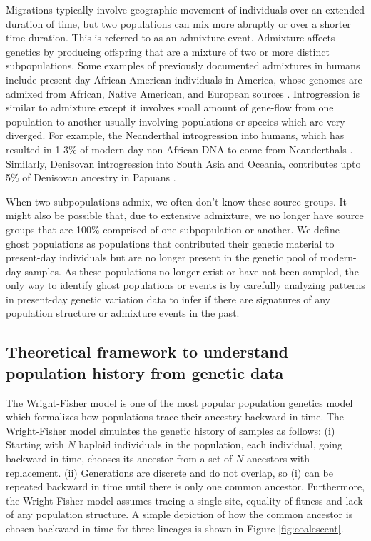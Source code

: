 Migrations typically involve geographic movement of individuals over an extended duration of time, but two populations can mix more abruptly or over a shorter time duration. This is referred to as an admixture event. Admixture affects genetics by producing offspring that are a mixture of two or more distinct subpopulations. Some examples of previously documented admixtures in humans include present-day African American individuals in America, whose genomes are admixed from African, Native American, and European sources \cite{smith2004high, price2009sensitive}. Introgression is similar to admixture except it involves small amount of gene-flow from one population to another usually involving populations or species which are very diverged. For example, the Neanderthal introgression into humans, which has resulted in 1-3\% of modern day non African DNA to come from Neanderthals \cite{sankararaman2014genomic}. Similarly, Denisovan introgression into South Asia and Oceania, contributes upto 5\% of Denisovan ancestry in Papuans \cite{reich2010genetic}. 

When two subpopulations admix, we often don't know these source groups. It might also be possible that, due to extensive admixture, we no longer have source groups that are 100\% comprised of one subpopulation or another. We define ghost populations as populations that contributed their genetic material to present-day individuals but are no longer present in the genetic pool of modern-day samples. As these populations no longer exist or have not been sampled, the only way to identify ghost populations or events is by carefully analyzing patterns in present-day genetic variation data to infer if there are signatures of any population structure or admixture events in the past.

\subsection{Theoretical framework to understand population history from genetic data}

The Wright-Fisher model \cite{Wright1931, Fisher1930} is one of the most popular population genetics model which formalizes how populations trace their ancestry backward in time.  The Wright-Fisher model simulates the genetic history of samples as follows: (i) Starting with $N$ haploid individuals in the population, each individual, going backward in time, chooses its ancestor from a set of $N$ ancestors with replacement. (ii) Generations are discrete and do not overlap, so (i) can be repeated backward in time until there is only one common ancestor. Furthermore, the Wright-Fisher model assumes tracing a single-site, equality of fitness and lack of any population structure. A simple depiction of how the common ancestor is chosen backward in time for three lineages is shown in Figure \ref{fig:coalescent}.

